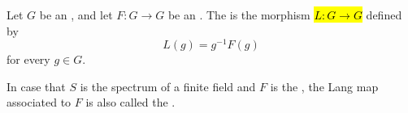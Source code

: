 \begin{definition} \label{definition:lang_map_of_an_endomorphism_of_an_algebraic_group}
Let $G$ be an , and let $F: G \to G$ be an . The  is the morphism \hl{$L: G \to G$} defined by
$$ L(g) = g^{-1} F(g) $$
for every $g \in G$. 

In case that $S$ is the spectrum of a finite field and $F$ is the , the Lang map associated to $F$ is also called the .
\end{definition}